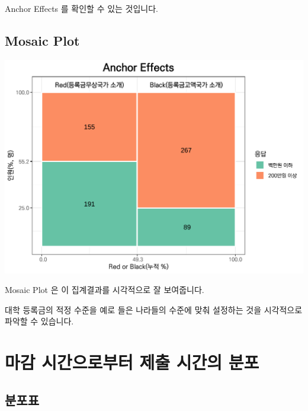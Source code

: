 \documentclass[
]{book}
\begin{document}
Anchor Effects 를 확인할 수 있는 것입니다.

\subsection{Mosaic Plot}\label{mosaic-plot-25}

\includegraphics{Quiz_report_2025_files/figure-latex/unnamed-chunk-347-1.pdf}

Mosaic Plot 은 이 집계결과를 시각적으로 잘 보여줍니다.

대학 등록금의 적정 수준을 예로 들은 나라들의 수준에 맞춰 설정하는 것을 시각적으로 파악할 수 있습니다.

\section{마감 시간으로부터 제출 시간의 분포}\label{uxb9c8uxac10-uxc2dcuxac04uxc73cuxb85cuxbd80uxd130-uxc81cuxcd9c-uxc2dcuxac04uxc758-uxbd84uxd3ec-11}

\subsection{분포표}\label{uxbd84uxd3ecuxd45c-12}
\end{document}
